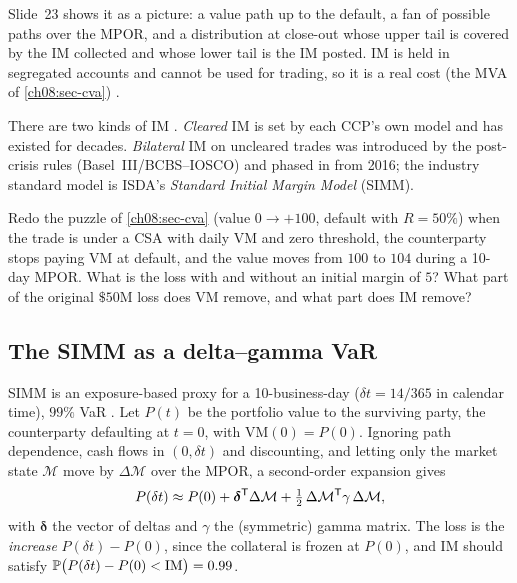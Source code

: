\begin{paracol}{2}
Slide~23 shows it as a picture: a value path up to the default, a fan of possible paths over the MPOR, and a
distribution at close-out whose upper tail is covered by the IM collected and whose lower tail is the IM posted.
IM is held in segregated accounts and cannot be used for trading, so it is a real cost (the MVA of
\cref{ch08:sec-cva}) .

There are two kinds of IM . \emph{Cleared} IM is set by each CCP's own model and has existed for
decades. \emph{Bilateral} IM on uncleared trades was introduced by the post-crisis rules (Basel~III/BCBS--IOSCO) and
phased in from 2016; the industry standard model is ISDA's \emph{Standard Initial Margin Model} (SIMM).

\begin{exercise}
Redo the puzzle of \cref{ch08:sec-cva} (value $0\to+100$, default with $R=50\%$) when the trade is under a CSA with
daily VM and zero threshold, the counterparty stops paying VM at default, and the value moves from $100$ to $104$
during a 10-day MPOR. What is the loss with and without an initial margin of $5$? What part of the original $\$50$M
loss does VM remove, and what part does IM remove?
\end{exercise}

\subsection{The SIMM as a delta--gamma VaR}
SIMM is an exposure-based proxy for a 10-business-day ($\delta t=14/365$ in calendar time), $99\%$ VaR
. Let $P(t)$ be the portfolio value to the surviving party, the counterparty defaulting at $t=0$,
with $\mathrm{VM}(0)=P(0)$. Ignoring path dependence, cash flows in $(0,\delta t)$ and discounting, and letting only
the market state $\mathcal M$ move by $\Delta\mathcal M$ over the MPOR, a second-order expansion gives
\[
  P(\delta t)\approx P(0)+\bm\delta^{\mathsf T}\Delta\mathcal M+\tfrac12\,\Delta\mathcal M^{\mathsf T}\gamma\,\Delta\mathcal M ,
\]
with $\bm\delta$ the vector of deltas and $\gamma$ the (symmetric) gamma matrix. The loss is the \emph{increase}
$P(\delta t)-P(0)$, since the collateral is frozen at $P(0)$, and IM should satisfy
$\mathbb{P}\bigl(P(\delta t)-P(0)<\mathrm{IM}\bigr)=0.99$.


\end{paracol}
